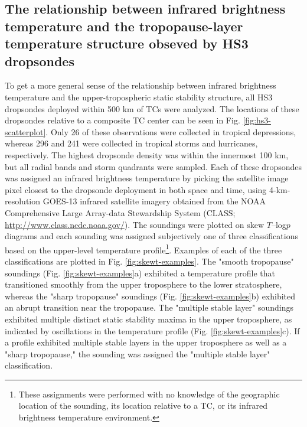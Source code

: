 \subsection{The relationship between infrared brightness temperature and the tropopause-layer temperature structure obseved by HS3 dropsondes}
To get a more general sense of the relationship between infrared brightness temperature and the upper-tropospheric static stability structure, all HS3 dropsondes deployed within 500 km of TCs were analyzed.
The locations of these dropsondes relative to a composite TC center can be seen in Fig. \ref{fig:hs3-scatterplot}.
Only 26 of these observations were collected in tropical depressions, whereas 296 and 241 were collected in tropical storms and hurricanes, respectively.
The highest dropsonde density was within the innermost 100 km, but all radial bands and storm quadrants were sampled.
Each of these dropsondes was assigned an infrared brightness temperature by picking the satellite image pixel closest to the dropsonde deployment in both space and time, using 4-km-resolution GOES-13 infrared satellite imagery obtained from the NOAA Comprehensive Large Array-data Stewardship System (CLASS; \url{http://www.class.ncdc.noaa.gov/}).
The soundings were plotted on skew $T$--log$p$ diagrams and each sounding was assigned subjectively one of three classifications based on the upper-level temperature profile\footnote{These assignments were performed with no knowledge of the geographic location of the sounding, its location relative to a TC, or its infrared brightness temperature environment.}.
Examples of each of the three classifications are plotted in Fig. \ref{fig:skewt-examples}.
The "smooth tropopause" soundings (Fig. \ref{fig:skewt-examples}a) exhibited a temperature profile that transitioned smoothly from the upper troposphere to the lower stratosphere, whereas the "sharp tropopause" soundings (Fig. \ref{fig:skewt-examples}b) exhibited an abrupt transition near the tropopause.
The "multiple stable layer" soundings exhibited multiple distinct static stability maxima in the upper troposphere, as indicated by oscillations in the temperature profile (Fig. \ref{fig:skewt-examples}c).
If a profile exhibited multiple stable layers in the upper troposphere as well as a "sharp tropopause," the sounding was assigned the "multiple stable layer" classification.

